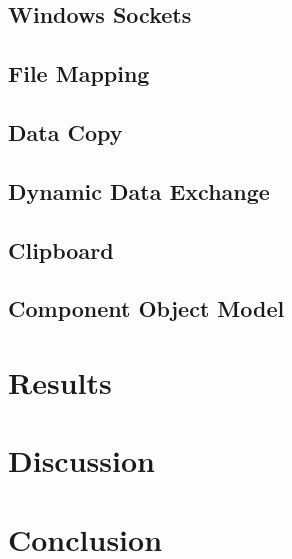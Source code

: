 \documentclass[12pt] {newrucsthesis}    %
\begin{document}
    \section{Windows Sockets} \label{winsocksection}

    \section{File Mapping} \label{filemapsection}

    \section{Data Copy} \label{datacopysection}

    \section{Dynamic Data Exchange} \label{ddesection}

    \section{Clipboard} \label{clipboardsection}

    \section{Component Object Model} \label{comsection}

  \chapter{Results} \label{resultsch}

  \chapter{Discussion}

  \chapter{Conclusion}

  
  
\end{document}
